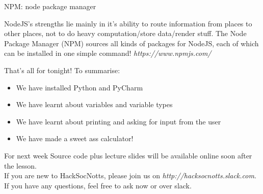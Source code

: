 \documentclass{beamer}
\begin{document}
\begin{frame}{NPM: node package manager}

NodeJS's strengths lie mainly in it's ability to route information from places to other places, not to do heavy computation/store data/render stuff.
\pause
The Node Package Manager (NPM) sources all kinds of packages for NodeJS, each of which can be installed in one simple command!
\pause
\textit{https://www.npmjs.com/}

\end{frame}

\begin{frame}{That's all for tonight!}
  To summarise:
  \begin{itemize}
  \item We have installed Python and PyCharm
  \item We have learnt about variables and variable types
  \item We have learnt about printing and asking for input from the user
  \item We have made a sweet ass calculator!
  \end{itemize}
\end{frame}

\begin{frame}{For next week}
Source code plus lecture slides will be available online soon after the lesson.\\
If you are new to HackSocNotts, please join us on \textit{http://hacksocnotts.slack.com}.\\
If you have any questions, feel free to ask now or over slack.\\
\end{frame}
\end{document}
